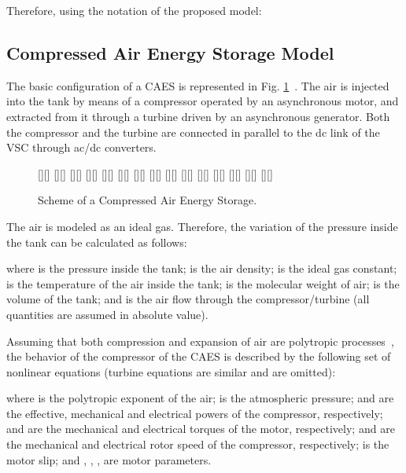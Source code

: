 \documentclass[journal, a4paper]{IEEEtran}
\begin{document}
Therefore, using the notation of the proposed model:



\vspace{-5mm}

\subsection{Compressed Air Energy Storage Model}
\label{subsec:caes}

The basic configuration of a CAES is
represented in Fig. \ref{fig:caes}~\cite{Vongmanee:09}.  The air is
injected into the tank by means of a compressor operated by an
asynchronous motor, and extracted from it through a turbine driven by
an asynchronous generator.  Both the compressor and the turbine are
connected in parallel to the dc link of the VSC through ac/dc
converters.
\begin{figure}[htb]
  \begin{center}
    [][]{\huge }
    [][]{\huge }
    [][]{\huge }
    [][]{\LARGE }
    [][]{\LARGE }
    \psfrag{+}[][]{\Large }
    \psfrag{-}[][]{\Large }
    [][]{\Huge }
    [][]{\Huge }
    [][]{\Huge }
    [][]{\Huge }
    [][]{\Huge }
    [][]{\Huge }
    [][]{\Huge }
    [][]{\Huge }
\caption{Scheme of a Compressed Air Energy Storage.}
    \label{fig:caes}
  \end{center}
\vspace{-0.4cm}
\end{figure}

The air is modeled as an ideal gas.  Therefore, the variation
of the pressure inside the tank can be calculated as follows:

where  is the pressure inside the tank;  is the air
density;  is the ideal gas constant;  is the
temperature of the air inside the tank;  is the molecular
weight of air;  is the volume of the tank; and  is the air
flow through the compressor/turbine (all quantities are assumed in
absolute value).



Assuming that both compression and expansion of air are polytropic
processes~\cite{Vongmanee:09}, the behavior of the compressor of the
CAES is described by the following set of nonlinear equations (turbine
equations are similar and are omitted):

where  is the polytropic exponent of the air;  is the
atmos\-pheric pressure;  and  are
the effective, mechanical and electrical powers of the compressor,
respectively;  and  are the mechanical and
electrical torques of the motor, respectively;  and
 are the mechanical and electrical rotor speed of the
compressor, respectively;  is the motor slip; 
and , , , 
 are motor parameters.
\end{document}
